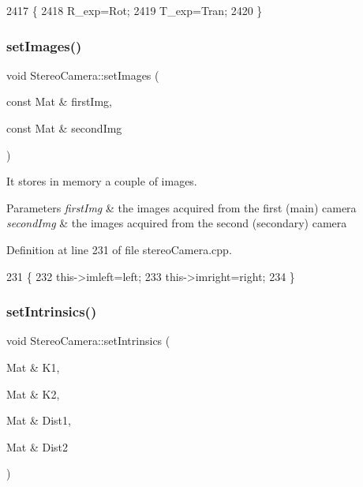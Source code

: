 \begin{DoxyCode}
2417 \{
2418     R\_exp=Rot;
2419     T\_exp=Tran;
2420 \}
\end{DoxyCode}
\mbox{\label{classStereoCamera_adc36a2585c583219bddbb1c7fb0725df}} 
\subsubsection{\texorpdfstring{set\+Images()}{setImages()}}
{\footnotesize\ttfamily void Stereo\+Camera\+::set\+Images (\begin{DoxyParamCaption}\item[{const Mat \&}]{first\+Img,  }\item[{const Mat \&}]{second\+Img }\end{DoxyParamCaption})}



It stores in memory a couple of images. 


\begin{DoxyParams}{Parameters}
{\em first\+Img} & the images acquired from the first (main) camera \\
\hline
{\em second\+Img} & the images acquired from the second (secondary) camera \\
\hline
\end{DoxyParams}


Definition at line 231 of file stereo\+Camera.\+cpp.


\begin{DoxyCode}
231                                                               \{
232     this->imleft=left;
233     this->imright=right;
234 \}
\end{DoxyCode}
\mbox{\label{classStereoCamera_a54754623497c8dddb61f520e17f465f8}} 
\subsubsection{\texorpdfstring{set\+Intrinsics()}{setIntrinsics()}}
{\footnotesize\ttfamily void Stereo\+Camera\+::set\+Intrinsics (\begin{DoxyParamCaption}\item[{Mat \&}]{K1,  }\item[{Mat \&}]{K2,  }\item[{Mat \&}]{Dist1,  }\item[{Mat \&}]{Dist2 }\end{DoxyParamCaption})}




